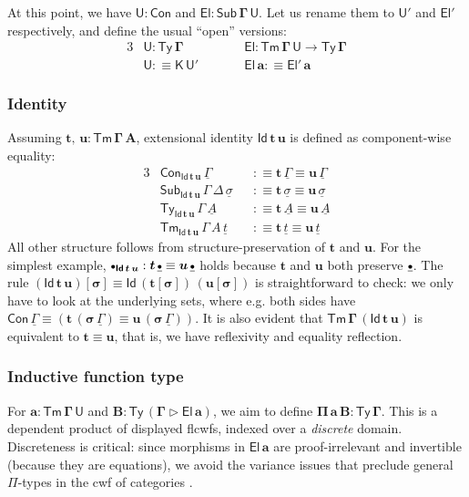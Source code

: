 \documentclass[12pt,a4paper,twoside,openany]{book}
\theoremstyle{remark}
\theoremstyle{definition}
\theoremstyle{theorem}
\newcommand{\bs}[1]{\boldsymbol{#1}}
\newcommand{\Con}{\mathsf{Con}}
\newcommand{\Sub}{\mathsf{Sub}}
\newcommand{\Tm}{\mathsf{Tm}}
\newcommand{\Ty}{\mathsf{Ty}}
\newcommand{\U}{\mathsf{U}}
\newcommand{\El}{\mathsf{El}}
\newcommand{\Id}{\mathsf{Id}}
\newcommand{\ext}{\triangleright}
\newcommand{\emptycon}{\scaleobj{.75}\bullet}
\newcommand{\K}{\mathsf{K}}
\newcommand{\bsigma}{\bs{\sigma}}
\newcommand{\bt}{\bs{t}}
\newcommand{\bu}{\bs{u}}
\newcommand{\ba}{\bs{a}}
\newcommand{\bU}{\bs{\U}}
\newcommand{\bEl}{\bs{\El}}
\newcommand{\ul}[1]{\underline{#1}}
\newcommand{\ulGamma}{\ul{\Gamma}}
\newcommand{\ulsigma}{\ul{\sigma}}
\newcommand{\ulemptycon}{\ul{\emptycon}}
\newcommand{\ult}{\ul{t}}
\newcommand{\ulA}{\ul{A}}
\newcommand{\defn}{:\equiv}
\begin{document}
At this point, we have $\bs{\U : \Con}$ and $\bs{\El : \Sub\,\Gamma\,\U}$. Let us
rename them to $\bU'$ and $\bEl'$ respectively, and define the usual ``open''
versions:
\begin{alignat*}{3}
  &\bs{\U} : \bs{\Ty\,\Gamma} &&\bs{\El} : \bs{\Tm\,\Gamma\,\U} \to \bs{\Ty\,\Gamma}\\
  &\bs{\U} \defn \bs{\K\,\U'}\hspace{2em}&&\bs{\El}\,\ba \defn \bEl'\,\ba
\end{alignat*}

\subsubsection{Identity}

Assuming $\bs{t,\,u : \Tm\,\Gamma\,A}$, extensional identity $\bs{\Id\,t\,u}$ is
defined as component-wise equality:
\begin{alignat*}{3}
  & \Con_{\bs{\Id\,t\,u}}\,\ulGamma &&\defn \bt\,\ulGamma \equiv \bu\,\ulGamma\\
  & \Sub_{\bs{\Id\,t\,u}}\,\Gamma\,\Delta\,\ulsigma &&\defn \bt\,\ulsigma \equiv \bu\,\ulsigma\\
  & \Ty_{\bs{\Id\,t\,u}}\,\Gamma\,\ulA &&\defn \bt\,\ulA \equiv \bu\,\ulA\\
  & \Tm_{\bs{\Id\,t\,u}}\,\Gamma\,A\,\ult &&\defn \bt\,\ult \equiv \bu\,\ult
\end{alignat*}
All other structure follows from structure-preservation of $\bt$ and $\bu$. For
the simplest example, $\emptycon_{\bs{\Id\,t\,u}} : \bt\,\ulemptycon \equiv
\bu\,\ulemptycon$ holds because $\bt$ and $\bu$ both preserve $\ulemptycon$. The
rule $\bs{(\Id\,t\,u)[\sigma]} \equiv \bs{\Id\,(t[\sigma])\,(u[\sigma])}$ is
straightforward to check: we only have to look at the underlying sets, where
e.g. both sides have $\Con\,\ulGamma \equiv (\bt\,(\bsigma\,\ulGamma) \equiv
\bu\,(\bsigma\,\ulGamma))$. It is also evident that
$\bs{\Tm\,\Gamma\,(\Id\,t\,u)}$ is equivalent to $\bt \equiv \bu$, that is, we
have reflexivity and equality reflection.

\subsubsection{Inductive function type}

For $\bs{a : \Tm\,\Gamma\,\U}$ and $\bs{B : \Ty\,(\Gamma \ext \El\,a)}$, we aim
to define $\bs{\Pi\,a\,B : \Ty\,\Gamma}$. This is a dependent product of displayed
flcwfs, indexed over a \emph{discrete} domain. Discreteness is critical: since
morphisms in $\bs{\El\,a}$ are proof-irrelevant and invertible (because they are
equations), we avoid the variance issues that preclude general $\Pi$-types in
the cwf of categories \cite[Secion~A1.5]{johnstone2002sketches}.
\end{document}
